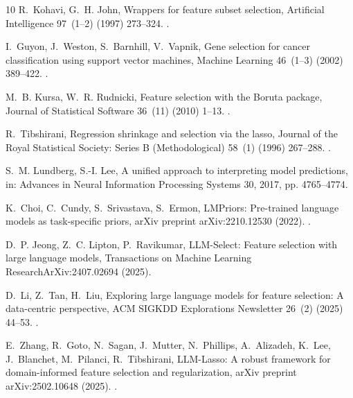 \documentclass[final,5p,twocolumn]{elsarticle}
\begin{document}
\begin{thebibliography}{10}
R.~Kohavi, G.~H. John, Wrappers for feature subset selection, Artificial
  Intelligence 97~(1--2) (1997) 273--324.
\newblock \href {https://doi.org/10.1016/S0004-3702(97)00043-X}
  {}.

I.~Guyon, J.~Weston, S.~Barnhill, V.~Vapnik, Gene selection for cancer
  classification using support vector machines, Machine Learning 46~(1--3)
  (2002) 389--422.
\newblock \href {https://doi.org/10.1023/A:1012487302797}
  {}.

M.~B. Kursa, W.~R. Rudnicki, Feature selection with the {B}oruta package,
  Journal of Statistical Software 36~(11) (2010) 1--13.
\newblock \href {https://doi.org/10.18637/jss.v036.i11}
  {}.

R.~Tibshirani, Regression shrinkage and selection via the lasso, Journal of the
  Royal Statistical Society: Series B (Methodological) 58~(1) (1996) 267--288.
\newblock \href {https://doi.org/10.1111/j.2517-6161.1996.tb02080.x}
  {}.

S.~M. Lundberg, S.-I. Lee, A unified approach to interpreting model
  predictions, in: Advances in Neural Information Processing Systems 30, 2017,
  pp. 4765--4774.

K.~Choi, C.~Cundy, S.~Srivastava, S.~Ermon, {LMPriors}: Pre-trained language
  models as task-specific priors, arXiv preprint arXiv:2210.12530 (2022).
\newblock \href {https://doi.org/10.48550/arXiv.2210.12530}
  {}.

D.~P. Jeong, Z.~C. Lipton, P.~Ravikumar, {LLM-Select}: Feature selection with
  large language models, Transactions on Machine Learning
  ResearchArXiv:2407.02694 (2025).

D.~Li, Z.~Tan, H.~Liu, Exploring large language models for feature selection: A
  data-centric perspective, ACM SIGKDD Explorations Newsletter 26~(2) (2025)
  44--53.
\newblock \href {https://doi.org/10.1145/3715073.3715077}
  {}.

E.~Zhang, R.~Goto, N.~Sagan, J.~Mutter, N.~Phillips, A.~Alizadeh, K.~Lee,
  J.~Blanchet, M.~Pilanci, R.~Tibshirani, {LLM-Lasso}: A robust framework for
  domain-informed feature selection and regularization, arXiv preprint
  arXiv:2502.10648 (2025).
\newblock \href {https://doi.org/10.48550/arXiv.2502.10648}
  {}.


\end{thebibliography}
\end{document}

